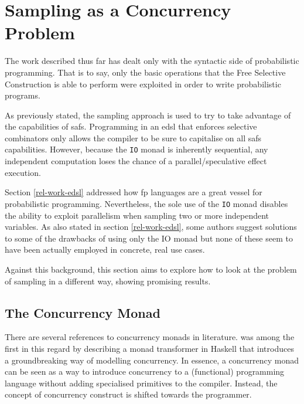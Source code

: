 \documentclass[
  oneside,
  11pt, a4paper,
  footinclude=true,
  headinclude=true,
  cleardoublepage=empty
]{scrbook}
\theoremstyle{definition}
\theoremstyle{definition}
\begin{document}
    \section{Sampling as a Concurrency Problem}\label{prob-conc}
    
    The work described thus far has dealt only with the syntactic side of probabilistic programming. That is to say, only the basic operations that the Free Selective Construction is able to perform were exploited in order to write probabilistic programs.
    
    As previously stated, the sampling approach is used to try to take advantage of the capabilities of \glspl{saf}. Programming in an \gls{edsl} that enforces selective combinators only allows the compiler to be sure to capitalise on all \glspl{saf} capabilities. However, because the \texttt{IO} monad is inherently sequential, any independent computation loses the chance of a parallel/speculative effect execution.
    
    Section \ref{rel-work-edsl} addressed how \gls{fp} languages are a great vessel for probabilistic programming. Nevertheless, the sole use of the \texttt{IO} monad disables the ability to exploit parallelism when sampling two or more independent variables. As also stated in section \ref{rel-work-edsl}, some authors suggest solutions to some of the drawbacks of using only the IO monad \citep{Scibior:2015:PPP:2887747.2804317, gordon2014probabilistic, jtobin} but none of these seem to have been actually employed in concrete, real use cases.
    
    Against this background, this section aims to explore how to look at the problem of sampling in a different way, showing promising results.
    
    \subsection{The Concurrency Monad}
    
    There are several references to concurrency monads in literature. \cite{Claessen1999FunctionalPA} was among the first in this regard by describing a monad transformer in Haskell that introduces a groundbreaking way of modelling concurrency. In essence, a concurrency monad can be seen as a way to introduce concurrency to a (functional) programming language without adding specialised primitives to the compiler. Instead, the concept of concurrency construct is shifted towards the programmer.
    
\end{document}
